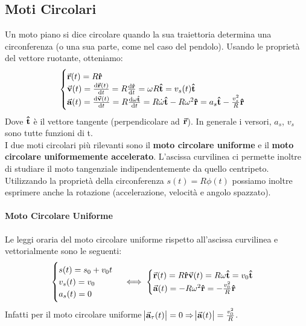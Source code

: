 \documentclass{report}
\newcommand{\then}{\ensuremath{\Rightarrow}}
\renewcommand{\a}{\va{a}}
\renewcommand{\v}{\va{v}}
\renewcommand{\r}{\va{r}}
\begin{document}
\subsection{Moti Circolari}
Un moto piano si dice circolare quando la sua traiettoria determina una circonferenza (o una sua parte, come nel caso del pendolo). Usando le proprietà del vettore ruotante, otteniamo:
\begin{equation}
\begin{cases}
    \r(t)=R\vu{r}\\
    \v(t)=\dv{\r(t)}{t}=R\dv{\vu{r}}{t}=\omega R\vu{t}=v_s(t)\vu{t}\\
    \a(t)=\dv{\v(t)}{t}=R\dv{\omega\vu{t}}{t}=R\Dot{\omega}\vu{t}-R\omega^2\vu{r}=a_s\vu{t}-\frac{v_s^2}{R}\vu{r}
\end{cases}
\end{equation}
Dove $\vu{t}$ è il vettore tangente (perpendicolare ad $\r$). In generale i versori, $a_s$, $v_s$ sono tutte funzioni di t.\\
I due moti circolari più rilevanti sono il \textbf{moto circolare uniforme} e il \textbf{moto circolare uniformemente accelerato}. L'ascissa curvilinea ci permette inoltre di studiare il moto tangenziale indipendentemente da quello centripeto. Utilizzando la proprietà della circonferenza $s(t)=R\phi(t)$ possiamo inoltre esprimere anche la rotazione (accelerazione, velocità e angolo spazzato).

\paragraph{Moto Circolare Uniforme}
Le leggi oraria del moto circolare uniforme rispetto all'ascissa curvilinea e vettorialmente sono le seguenti:
\begin{equation}
\begin{cases}
    s(t)=s_0+v_0t\\
    v_s(t)=v_0\\
    a_s(t)=0
\end{cases}\iff
\begin{cases}
    \r(t)=R\vu{r}
    \v(t)=R\omega\vu{t}=v_0\vu{t}\\
    \a(t)=-R\omega^2\vu{r}=-\frac{v_0^2}{R}\vu{r}
\end{cases}
\end{equation}
Infatti per il moto circolare uniforme $\abs{\a_{\tau}(t)}=0\then \abs{\a(t)}=\frac{v_0^2}{R}$.
\end{document}
